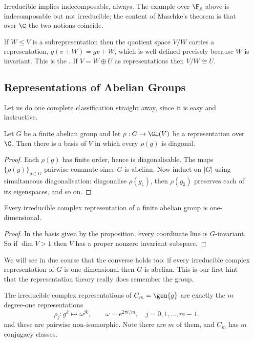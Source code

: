 Irreducible implies indecomposable, always. The example over $\F_p$ above is indecomposable but not irreducible; the content of Maschke's theorem is that over $\C$ the two notions coincide.

\begin{example}[Quotients]
	If $W \leq V$ is a subrepresentation then the quotient space $V/W$ carries a representation, $g(v + W) = gv + W$, which is well defined precisely because $W$ is invariant. This is the . If $V = W \oplus U$ as representations then $V/W \cong U$.
\end{example}

\subsection{Representations of Abelian Groups}

Let us do one complete classification straight away, since it is easy and instructive.

\begin{proposition}
	Let $G$ be a finite abelian group and let $\rho : G \to \GL(V)$ be a representation over $\C$. Then there is a basis of $V$ in which every $\rho(g)$ is diagonal.
\end{proposition}
\begin{proof}
	Each $\rho(g)$ has finite order, hence is diagonalisable. The maps $\{\rho(g)\}_{g \in G}$ pairwise commute since $G$ is abelian. Now induct on $|G|$ using simultaneous diagonalisation: diagonalise $\rho(g_1)$, then $\rho(g_2)$ preserves each of its eigenspaces, and so on.
\end{proof}

\begin{corollary}
	Every irreducible complex representation of a finite abelian group is one-dimensional.
\end{corollary}
\begin{proof}
	In the basis given by the proposition, every coordinate line is $G$-invariant. So if $\dim V > 1$ then $V$ has a proper nonzero invariant subspace.
\end{proof}

We will see in due course that the converse holds too: if every irreducible complex representation of $G$ is one-dimensional then $G$ is abelian. This is our first hint that the representation theory really does remember the group.

\begin{example}[$C_m$, completely]
	The irreducible complex representations of $C_m = \gen{g}$ are exactly the $m$ degree-one representations
	$$\rho_j : g^k \mapsto \omega^{jk}, \qquad \omega = e^{2\pi i /m}, \quad j = 0, 1, \dots, m-1,$$
	and these are pairwise non-isomorphic. Note there are $m$ of them, and $C_m$ has $m$ conjugacy classes.
\end{example}

